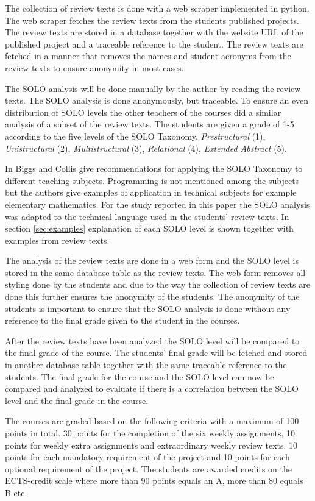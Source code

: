 \documentclass[twoside,twocolumn,a4paper,11pt,english]{article}
\begin{document}
The collection of review texts is done with a web scraper implemented in python. The web scraper fetches the review texts from the students published projects. The review texts are stored in a database together with the website URL of the published project and a traceable reference to the student. The review texts are fetched in a manner that removes the names and student acronyms from the review texts to ensure anonymity in most cases.

The SOLO analysis will be done manually by the author by reading the review texts. The SOLO analysis is done anonymously, but traceable. To ensure an even distribution of SOLO levels the other teachers of the courses did a similar analysis of a subset of the review texts. The students are given a grade of 1-5 according to the five levels of the SOLO Taxonomy, \textit{Prestructural} (1), \textit{Unistructural} (2), \textit{Multistructural} (3), \textit{Relational} (4), \textit{Extended Abstract} (5).

In \cite{biggs1982evaluation} Biggs and Collis give recommendations for applying the SOLO Taxonomy to different teaching subjects. Programming is not mentioned among the subjects but the authors give examples of application in technical subjects for example elementary mathematics. For the study reported in this paper the SOLO analysis was adapted to the technical language used in the students' review texts. In section \ref{sec:examples} explanation of each SOLO level is shown together with examples from review texts.

The analysis of the review texts are done in a web form and the SOLO level is stored in the same database table as the review texts. The web form removes all styling done by the students and due to the way the collection of review texts are done this further ensures the anonymity of the students. The anonymity of the students is important to ensure that the SOLO analysis is done without any reference to the final grade given to the student in the courses.

After the review texts have been analyzed the SOLO level will be compared to the final grade of the course. The students' final grade will be fetched and stored in another database table together with the same traceable reference to the students. The final grade for the course and the SOLO level can now be compared and analyzed to evaluate if there is a correlation between the SOLO level and the final grade in the course.

The courses are graded based on the following criteria with a maximum of 100 points in total. 30 points for the completion of the six weekly assignments, 10 points for weekly extra assignments and extraordinary weekly review texts. 10 points for each mandatory requirement of the project and 10 points for each optional requirement of the project. The students are awarded credits on the ECTS-credit scale where more than 90 points equals an A, more than 80 equals B etc.
\end{document}
